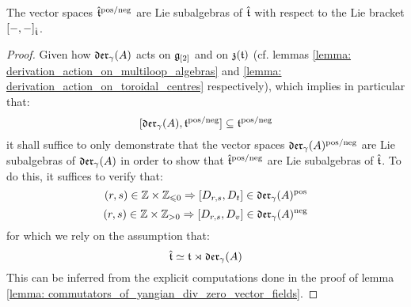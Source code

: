         \begin{lemma} \label{lemma: positive/negative_yangian_extended_toroidal_lie_algebras}
            The vector spaces $\hat{\mathfrak{t}}^{\mathrm{pos}/\mathrm{neg}}$ are Lie subalgebras of $\hat{\mathfrak{t}}$ with respect to the Lie bracket $[-, -]_{\hat{\mathfrak{t}}}$.
        \end{lemma}
            \begin{proof}
                Given how $\mathfrak{der}_{\gamma}(A)$ acts on $\mathfrak{g}_{[2]}$ and on $\mathfrak{z}(\mathfrak{t})$ (cf. lemmas \ref{lemma: derivation_action_on_multiloop_algebras} and \ref{lemma: derivation_action_on_toroidal_centres} respectively), which implies in particular that:
                    $$[\mathfrak{der}_{\gamma}(A), \mathfrak{t}^{\mathrm{pos}/\mathrm{neg}}] \subseteq \mathfrak{t}^{\mathrm{pos}/\mathrm{neg}}$$
                it shall suffice to only demonstrate that the vector spaces $\mathfrak{der}_{\gamma}(A)^{\mathrm{pos}/\mathrm{neg}}$ are Lie subalgebras of $\mathfrak{der}_{\gamma}(A)$ in order to show that $\hat{\mathfrak{t}}^{\mathrm{pos}/\mathrm{neg}}$ are Lie subalgebras of $\hat{\mathfrak{t}}$. To do this, it suffices to verify that:
                    $$(r, s) \in \Z \x \Z_{\leq 0} \implies [D_{r, s}, D_t] \in \divzero^{\positive}$$
                    $$(r, s) \in \Z \x \Z_{> 0} \implies [D_{r, s}, D_v] \in \divzero^{\negative}$$
                for which we rely on the assumption that:
                    $$\hat{\mathfrak{t}} \simeq \mathfrak{t} \rtimes \mathfrak{der}_{\gamma}(A)$$
                This can be inferred from the explicit computations done in the proof of lemma \ref{lemma: commutators_of_yangian_div_zero_vector_fields}.
            \end{proof}

